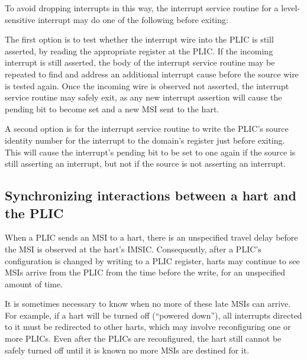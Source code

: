 To avoid dropping interrupts in this way, the interrupt service routine
for a level-sensitive interrupt may do one of the following before
exiting:

The first option is to test whether the interrupt wire into the PLIC
is still asserted, by reading the appropriate  register at
the PLIC.
If the incoming interrupt is still asserted, the body of the interrupt
service routine may be repeated to find and address an additional
interrupt cause before the source wire is tested again.
Once the incoming wire is observed not asserted, the interrupt service
routine may safely exit, as any new interrupt assertion will cause the
pending bit to become set and a new MSI sent to the hart.

A second option is for the interrupt service routine to write the
PLIC's source identity number for the interrupt to the domain's
 register just before exiting.
This will cause the interrupt's pending bit to be set to one again if
the source is still asserting an interrupt, but not if the source is
not asserting an interrupt.

\subsection{Synchronizing interactions between a hart and the PLIC}
\label{sec:AdvPLIC-MSISync}

When a PLIC sends an MSI to a hart, there is an unspecified travel
delay before the MSI is observed at the hart's IMSIC.
Consequently, after a PLIC's configuration is changed by writing to a
PLIC register, harts may continue to see MSIs arrive from the PLIC from
the time before the write, for an unspecified amount of time.

It is sometimes necessary to know when no more of these late MSIs can
arrive.
For example, if a hart will be turned off (``powered down''), all
interrupts directed to it must be redirected to other harts, which may
involve reconfiguring one or more PLICs.
Even after the PLICs are reconfigured, the hart still cannot be safely
turned off until it is known no more MSIs are destined for it.

